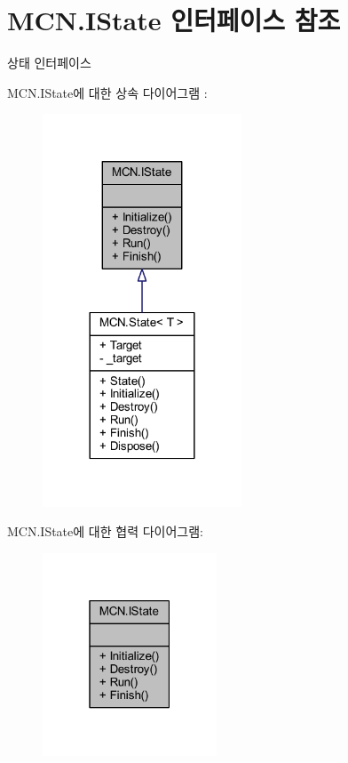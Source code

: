 \hypertarget{interface_m_c_n_1_1_i_state}{}\section{M\+C\+N.\+I\+State 인터페이스 참조}
\label{interface_m_c_n_1_1_i_state}


상태 인터페이스  




M\+C\+N.\+I\+State에 대한 상속 다이어그램 \+: \nopagebreak
\begin{figure}[H]
\begin{center}
\leavevmode
\includegraphics[width=168pt]{interface_m_c_n_1_1_i_state__inherit__graph}
\end{center}
\end{figure}


M\+C\+N.\+I\+State에 대한 협력 다이어그램\+:\nopagebreak
\begin{figure}[H]
\begin{center}
\leavevmode
\includegraphics[width=147pt]{interface_m_c_n_1_1_i_state__coll__graph}
\end{center}
\end{figure}

